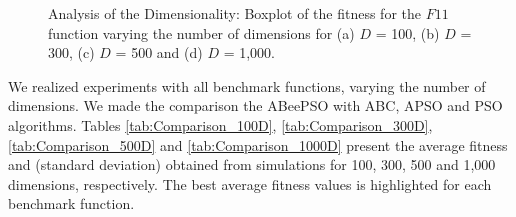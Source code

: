 \begin{figure}[!h]
\hspace{1mm}
\caption{\small{Analysis of the Dimensionality: Boxplot of the fitness for the $F11$ function varying the number of dimensions for (a) $D$ = 100, (b) $D$ = 300, (c) $D$ = 500 and (d) $D$ = 1,000.}}
\label{fig:Dimensionality_F11}
\end{figure}

We realized experiments with all benchmark functions, varying the number of dimensions. We made the comparison the ABeePSO with ABC, APSO and PSO algorithms. Tables \ref{tab:Comparison_100D}, \ref{tab:Comparison_300D}, \ref{tab:Comparison_500D} and \ref{tab:Comparison_1000D} present the average fitness and (standard deviation) obtained from simulations for 100, 300, 500 and 1,000 dimensions, respectively. The best average fitness values is highlighted for each benchmark function.

